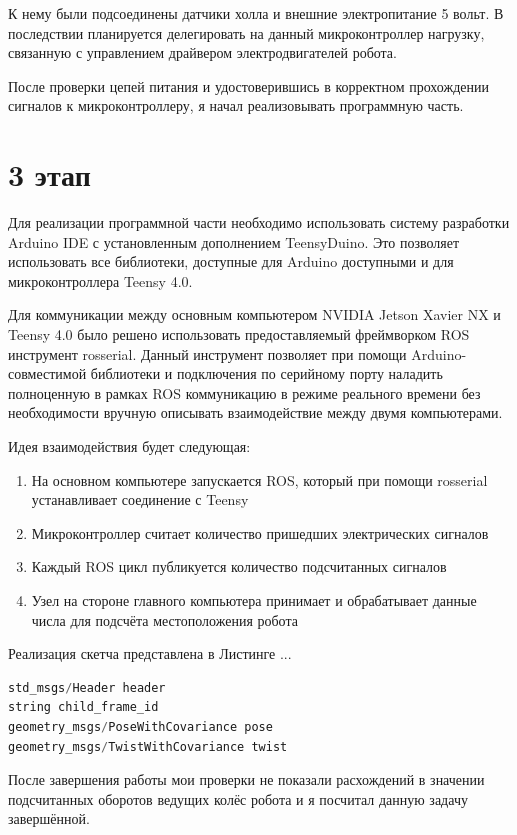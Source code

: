 \documentclass[12pt,a4paper]{scrartcl}
\begin{document}
			К нему были подсоединены датчики холла и внешние электропитание 5 вольт. В последствии планируется делегировать на данный микроконтроллер нагрузку, связанную с управлением драйвером электродвигателей робота.
			
			После проверки цепей питания и удостоверившись в корректном прохождении сигналов к микроконтроллеру, я начал реализовывать программную часть.
			
		\section*{3 этап}
			Для реализации программной части необходимо использовать систему разработки Arduino IDE с установленным дополнением TeensyDuino. Это позволяет использовать все библиотеки, доступные для Arduino доступными и для микроконтроллера Teensy 4.0. 
			
			Для коммуникации между основным компьютером NVIDIA Jetson Xavier NX и Teensy 4.0 было решено использовать предоставляемый фреймворком ROS инструмент rosserial. Данный инструмент позволяет при помощи Arduino-совместимой библиотеки и подключения по серийному порту наладить полноценную в рамках ROS коммуникацию в режиме реального времени без необходимости вручную описывать взаимодействие между двумя компьютерами.
			
			Идея взаимодействия будет следующая:
			\begin{enumerate}
				\item На основном компьютере запускается ROS, который при помощи rosserial устанавливает соединение с Teensy
				\item Микроконтроллер считает количество пришедших электрических сигналов
				\item Каждый ROS цикл публикуется количество подсчитанных сигналов
				\item Узел на стороне главного компьютера принимает и обрабатывает данные числа для подсчёта местоположения робота
			\end{enumerate}
			
			Реализация скетча представлена в Листинге ...
			
			\begin{lstlisting}[language=C,caption={Формат сообщения nav\_msgs/Odometry},label={lst:OdometryMsg}]
std_msgs/Header header
string child_frame_id
geometry_msgs/PoseWithCovariance pose
geometry_msgs/TwistWithCovariance twist
			\end{lstlisting}	
			
			После завершения работы мои проверки не показали расхождений в значении подсчитанных оборотов ведущих колёс робота и я посчитал данную задачу завершённой.
			
\end{document}
